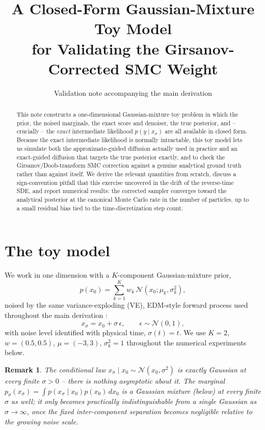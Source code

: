 \documentclass[english,10pt]{article}
\date{}
\title{A Closed-Form Gaussian-Mixture Toy Model \\
       for Validating the Girsanov-Corrected SMC Weight}
\author{Validation note accompanying the main derivation}
\date{}
\numberwithin{equation}{section}
\newtheorem{remark}{Remark}[section]
\begin{document}
\maketitle

\begin{abstract}
This note constructs a one-dimensional Gaussian-mixture toy problem in which the prior,
the noised marginals, the exact score and denoiser, the true posterior, and --
crucially -- the \emph{exact} intermediate likelihood $p(y\mid x_\sigma)$ are all
available in closed form. Because the exact intermediate likelihood is normally
intractable, this toy model lets us simulate both the approximate-guided diffusion
actually used in practice and an exact-guided diffusion that targets the true
posterior exactly, and to check the Girsanov/Doob-transform SMC correction against a
genuine analytical ground truth rather than against itself. We derive the relevant
quantities from scratch, discuss a sign-convention pitfall that this exercise
uncovered in the drift of the reverse-time SDE, and report numerical results:
the corrected sampler converges toward the analytical posterior at the canonical
Monte Carlo rate in the number of particles, up to a small residual bias tied to
the time-discretization step count.
\end{abstract}

\section{The toy model}
\label{sec:model}

We work in one dimension with a $K$-component Gaussian-mixture prior,
\begin{equation}
p(x_0) = \sum_{k=1}^K w_k \, \mathcal N(x_0;\mu_k,\sigma_k^2),
\label{eq:prior}
\end{equation}
noised by the same variance-exploding (VE), EDM-style forward process used
throughout the main derivation \citep{karras2022elucidating}:
\begin{equation}
x_\sigma = x_0 + \sigma\,\epsilon, \qquad \epsilon\sim\mathcal N(0,1),
\label{eq:forward}
\end{equation}
with noise level identified with physical time, $\sigma(t)=t$. We use
$K=2$, $w=(0.5,0.5)$, $\mu=(-3,3)$, $\sigma_k^2=1$ throughout the numerical
experiments below.

\begin{remark}
The conditional law $x_\sigma\mid x_0\sim\mathcal N(x_0,\sigma^2)$ is exactly
Gaussian at \emph{every} finite $\sigma>0$ -- there is nothing asymptotic about
it. The marginal $p_\sigma(x_\sigma)=\int p(x_\sigma\mid x_0)p(x_0)\,dx_0$ is a
Gaussian mixture (below) at every finite $\sigma$ as well; it only becomes
\emph{practically} indistinguishable from a single Gaussian as $\sigma\to\infty$,
once the fixed inter-component separation becomes negligible relative to the
growing noise scale.
\end{remark}
\end{document}
